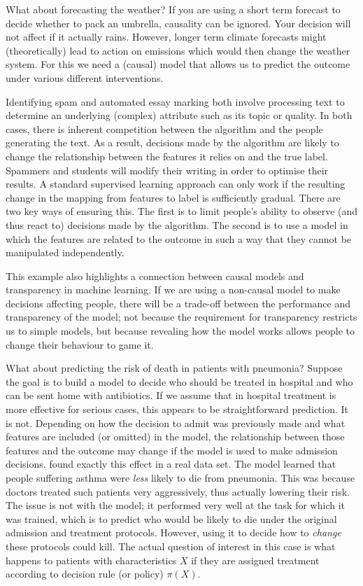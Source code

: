 \documentclass[11pt,a4paper,twoside]{report}
\theoremstyle{plain}
\theoremstyle{definition}
\begin{document}
What about forecasting the weather? If you are using a short term forecast to decide whether to pack an umbrella, causality can be ignored. Your decision will not affect if it actually rains. However, longer term climate forecasts might (theoretically) lead to action on emissions which would then change the weather system. For this we need a (causal) model that allows us to predict the outcome under various different interventions.

Identifying spam and automated essay marking both involve processing text to determine an underlying (complex) attribute such as its topic or quality. In both cases, there is inherent competition between the algorithm and the people generating the text. As a result, decisions made by the algorithm are likely to change the relationship between the features it relies on and the true label. Spammers and students will modify their writing in order to optimise their results. A standard supervised learning approach can only work if the resulting change in the mapping from features to label is sufficiently gradual. There are two key ways of ensuring this. The first is to limit people's ability to observe (and thus react to) decisions made by the algorithm. The second is to use a model in which the features are related to the outcome in such a way that they cannot be manipulated independently. 

This example also highlights a connection between causal models and transparency in machine learning. If we are using a non-causal model to make decisions affecting people, there will be a trade-off between the performance and transparency of the model; not because the requirement for transparency restricts us to simple models, but because revealing how the model works allows people to change their behaviour to game it. 

What about predicting the risk of death in patients with pneumonia? Suppose the goal is to build a model to decide who should be treated in hospital and who can be sent home with antibiotics. If we assume that in hospital treatment is more effective for serious cases, this appears to be straightforward prediction. It is not. Depending on how the decision to admit was previously made and what features are included (or omitted) in the model, the relationship between those features and the outcome may change if the model is used to make admission decisions. \citet{Caruana2015} found exactly this effect in a real data set. The model learned that people suffering asthma were \emph{less} likely to die from pneumonia. This was because doctors treated such patients very aggressively, thus actually lowering their risk. The issue is not with the model; it performed very well at the task for which it was trained, which is to predict who would be likely to die under the original admission and treatment protocols. However, using it to decide how to \emph{change} these protocols could kill. The actual question of interest in this case is what happens to patients with characteristics $X$ if they are assigned treatment according to decision rule (or policy) $\pi(X)$. 
\end{document}
